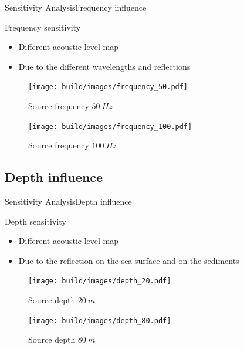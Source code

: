 \documentclass[9pt, xcolor={usenames, dvipsnames}]{beamer}
\begin{document}
				\begin{frame}{Sensitivity Analysis}{Frequency influence}
					\centering
					\begin{minipage}{0.8\textwidth}
						\begin{block}{Frequency sensitivity}
							\begin{itemize}
								\item Different acoustic level map
								\item Due to the different wavelengths and reflections
							\end{itemize}
						\end{block}
					\end{minipage}
					\begin{minipage}[t]{0.47\textwidth}
						\begin{figure}
							\texttt{[image: build/images/frequency\_50.pdf]}
							\caption{Source frequency $50\ Hz$}
						\end{figure}
					\end{minipage}
					\hfill
					\begin{minipage}[t]{0.47\textwidth}
						\begin{figure}
							\texttt{[image: build/images/frequency\_100.pdf]}
							\caption{Source frequency $100\ Hz$}
						\end{figure}
					\end{minipage}
				\end{frame}

			\subsection{Depth influence}

				\begin{frame}{Sensitivity Analysis}{Depth influence}
					\centering
					\begin{minipage}{0.8\textwidth}
						\begin{block}{Depth sensitivity}
							\begin{itemize}
								\item Different acoustic level map
								\item Due to the reflection on the sea surface and on the sediments
							\end{itemize}
						\end{block}
					\end{minipage}
					\hfill
					\begin{minipage}[t]{0.47\textwidth}
						\begin{figure}
							\texttt{[image: build/images/depth\_20.pdf]}
							\caption{Source depth $20\ m$}
						\end{figure}
					\end{minipage}
					\hfill
					\begin{minipage}[t]{0.47\textwidth}
						\begin{figure}
							\texttt{[image: build/images/depth\_80.pdf]}
							\caption{Source depth $80\ m$}
						\end{figure}
					\end{minipage}
				\end{frame}
\end{document}
